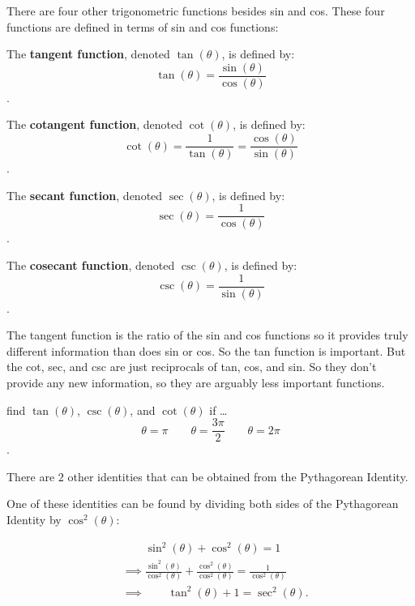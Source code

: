 
There are four other trigonometric functions besides sin and cos. These four
functions are defined in terms of sin and cos functions:

\begin{definition}
  \label{def:the_other_4_trig_functions}

  The \textbf{tangent function}, denoted $\tan (\theta)$, is defined by:
  \[ \tan (\theta) = \frac{\sin (\theta)}{\cos (\theta)} \].

  The \textbf{cotangent function}, denoted $\cot (\theta)$, is defined by:
  \[ \cot (\theta) = \frac{1}{\tan (\theta)} = \frac{\cos (\theta)}{\sin (\theta)} \].

  The \textbf{secant function}, denoted $\sec (\theta)$, is defined by:
  \[ \sec (\theta) = \frac{1}{\cos (\theta)} \]. 

  The \textbf{cosecant function}, denoted $\csc (\theta)$, is defined by:
  \[ \csc (\theta) = \frac{1}{\sin (\theta)} \].
\end{definition}

The tangent function is the ratio of the sin and cos functions so it provides
truly different information than does sin or cos. So the tan function is
important. But the cot, sec, and csc are just reciprocals of tan, cos, and sin.
So they don't provide any new information, so they are arguably less important
functions.

\begin{exc}
  \label{exc:find_tan_sec_csc_and_cot}

  find $\tan (\theta)$, $\csc (\theta)$, and $\cot (\theta)$ if \ldots
  \[ \theta = \pi \qquad \theta = \frac{3\pi}{2} \qquad \theta = 2\pi \].
\end{exc}

There are $2$ other identities that can be obtained from the Pythagorean
Identity.

One of these identities can be found by dividing both sides of the Pythagorean
Identity by $\cos^{2} (\theta)$:

\begin{align*}
  &\qquad\sin^{2} (\theta) + \cos^{2} (\theta) = 1 \\
  &\implies \frac{\sin^{2} (\theta)}{\cos^{2} (\theta)} + \frac{\cos^{2} (\theta)}{\cos^{2} (\theta)} = \frac{1}{\cos^{2} (\theta)} \\
  &\implies \qquad \tan^{2} (\theta) + 1 = \sec^{2} (\theta)
.\end{align*}

